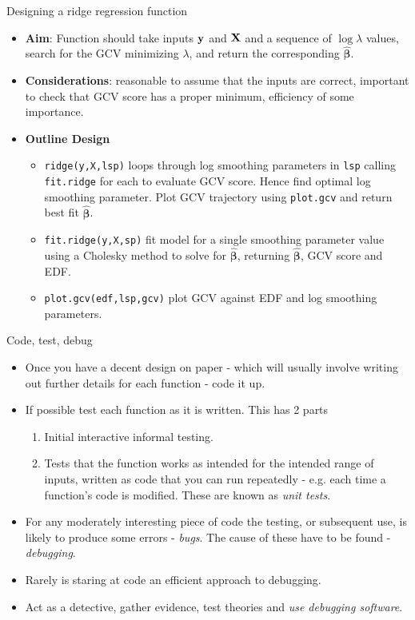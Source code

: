 \documentclass{beamer}
\newcommand{\bp}{{\bm \beta}}
\begin{document}
\begin{frame}[fragile]{Designing a ridge regression function}
\begin{itemize}
\item {\bf Aim}: Function should take inputs ${\bf y}$ and ${\bf X}$ and a sequence of $\log \lambda$ values, search for the GCV minimizing $\lambda$, and return the corresponding $\hat \bp$.
\item {\bf Considerations}: reasonable to assume that the inputs are correct, important to check that GCV score has a proper minimum, efficiency of some importance.
\item {\bf Outline Design}
\begin{itemize}
\item \verb+ridge(y,X,lsp)+ loops through log smoothing parameters in {\tt lsp} calling {\tt fit.ridge} for each to evaluate GCV score. Hence find optimal log smoothing parameter. Plot GCV trajectory using {\tt plot.gcv} and return best fit $\hat \bp $.
\item \verb+fit.ridge(y,X,sp)+ fit model for a single smoothing parameter value using a Cholesky method to solve for $\hat {\bm \beta}$, returning $\hat {\bm \beta}$, GCV score and EDF.
\item \verb+plot.gcv(edf,lsp,gcv)+ plot GCV against EDF and log smoothing parameters. 
\end{itemize} 
\end{itemize}
\end{frame}

\begin{frame}[fragile]{Code, test, debug}
\begin{itemize}
\item Once you have a decent design on paper - which will usually involve writing out further details for each function -  code it up. 
\item If possible test each function as it is written. This has 2 parts
\begin{enumerate} 
\item Initial interactive informal testing.
\item Tests that the function works as intended for the intended range of inputs, written as code that you can run repeatedly - e.g. each time a function's code is modified. These are known as {\em unit tests}.
\end{enumerate}
\item For any moderately interesting piece of code the testing, or subsequent use, is likely to produce some errors - {\em bugs}. The cause of these have to be found - {\em debugging}.
\item Rarely is staring at code an efficient approach to debugging.
\item Act as a detective, gather evidence, test theories and {\em use debugging software}.
\end{itemize}
\end{frame}
\end{document}

